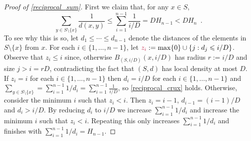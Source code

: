 \documentclass{patmorin}
\makeatletter
\renewcommand{\le}{\leqslant}
\def\mathcolor#1#{\@mathcolor{#1}}
\def\@mathcolor#1#2#3{%
  \protect\leavevmode
  \begingroup
    \color#1{#2}#3%
  \endgroup
}
\newcommand{\mathdefin}[1]{\mathcolor{brightmaroon}{#1}}
\makeatother
\begin{document}
\begin{proof}[Proof of \cref{reciprocal_sum}]
  First we claim that, for any $x\in S$,
  \begin{equation}
    \sum_{y\in S\setminus\{x\}} \frac{1}{d(x,y)} \le \sum_{i=1}^{n-1}\frac{1}{i/D} = DH_{n-1} < DH_n \enspace . \label{reciprocal_crux}
  \end{equation}
  To see why this is so, let $d_1\le\cdots\le d_{n-1}$ denote the distances of the elements in $S\setminus\{x\}$ from $x$.  For each $i\in\{1,\ldots,n-1\}$, let $\mathdefin{z_i}:=\max\{0\}\cup\{j: d_j \le i/D\}$. Observe that $z_i \le i$ since, otherwise $B_{(S,i/D)}(x,i/D)$ has radius $r:=i/D$ and size $j>i=rD$, contradicting the fact that $(S,d)$ has local density at most $D$.  If $z_i=i$ for each $i\in\{1,\ldots,n-1\}$ then $d_i=i/D$ for each $i\in\{1,\ldots,n-1\}$ and $\sum_{y\in S\setminus\{x\}}=\sum_{i=1}^{n-1}1/d_i=\sum_{i=1}^{n-1}\frac{1}{i/D}$, so \eqref{reciprocal_crux} holds.  Otherwise, consider the minimum $i$ such that $z_i < i$.  Then $z_i=i-1$, $d_{i-1}=(i-1)/D$ and $d_i > i/D$. By reducing $d_i$ to $i/D$ we increase $\sum_{i=1}^{n-1} 1/d_i$ and increase the minimum $i$ such that $z_i < i$.  Repeating this only increases $\sum_{i=1}^{n-1} 1/d_i$ and finishes with $\sum_{i=1}^{n-1} 1/d_i= H_{n-1}$.


\end{proof}
\end{document}
